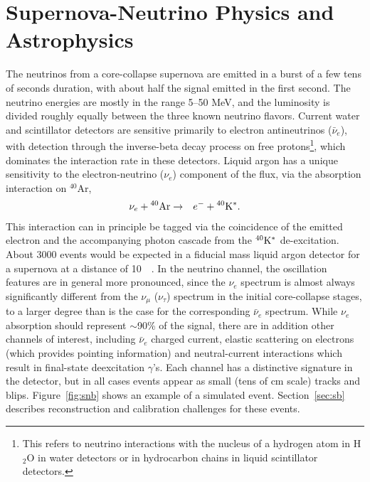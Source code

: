 

\section{Supernova-Neutrino Physics and Astrophysics}

The neutrinos from a core-collapse supernova are emitted in a burst of
a few tens of seconds duration, with about half the signal emitted in the first
second. The neutrino energies are mostly in the range 5--50 MeV, and the
luminosity is divided roughly equally between the three known neutrino
flavors.  Current water and scintillator detectors are sensitive primarily to
electron antineutrinos ($\bar{\nu}_e$), with detection through the inverse-beta decay
process on free protons\footnote{This refers to neutrino interactions with the nucleus of a
hydrogen atom in H$_2$O in water detectors or in hydrocarbon chains in 
liquid scintillator detectors.},
 which dominates the interaction rate in these detectors.  Liquid argon has a unique sensitivity to
the electron-neutrino ($\nu_e$) component of the flux, via the absorption
interaction on $^{40}$Ar,
\begin{eqnarray*}
\nu_e +{}^{40}{\rm Ar} & \rightarrow & e^-+{}^{40}{\rm K^*}.
\end{eqnarray*} 
This interaction can in principle be tagged via the coincidence of the emitted
electron and the accompanying photon cascade from the $^{40}{\rm K^*}$
de-excitation.  About \num{3000} events would be expected in a 
fiducial mass liquid argon detector for a supernova at a distance of
\SI{10}{\kilo\parsec}.  In the neutrino channel, the oscillation
features are in general more pronounced, since the $\nu_e$ spectrum is almost
always significantly different from the $\nu_\mu$ ($\nu_\tau$) spectrum 
in the initial core-collapse stages, to a larger degree than is the
case for the corresponding $\bar{\nu}_e$ spectrum.  
While $\nu_e$ absorption should represent $\sim$90\% of the signal, there are in addition other channels of interest, including $\bar{\nu}_e$ charged current, elastic scattering on electrons (which provides pointing information) and neutral-current
interactions which result in final-state deexcitation $\gamma$'s. 
Each channel has a distinctive signature in the detector, but in all cases events appear as small (tens of cm scale) tracks and blips.   Figure~\ref{fig:snb} shows an example of a simulated event.  Section~\ref{sec:sb} describes reconstruction and calibration challenges for these events.


